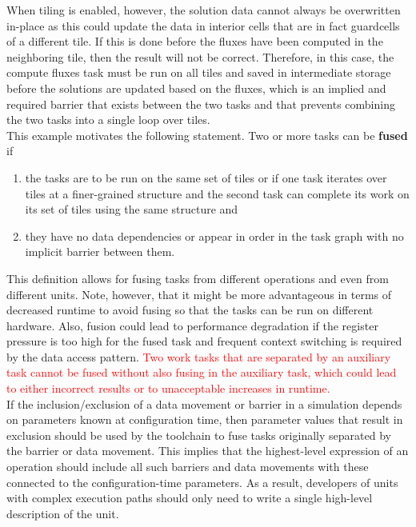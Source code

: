 \documentclass{article}
\begin{document}
When tiling is enabled, however, the solution data cannot always be overwritten
in-place as this could update the data in interior cells that are in fact
guardcells of a different tile.  If this is done before the fluxes have been
computed in the neighboring tile, then the result will not be correct.
Therefore, in this case, the compute fluxes task must be run on all tiles and
saved in intermediate storage before the solutions are updated based on the
fluxes, which is an implied and required barrier that exists between
the two tasks and that prevents combining the two tasks into a single loop over
tiles.\\


This example motivates the following statement.  Two or more tasks can be
\textbf{fused} if
\begin{enumerate}
\item{the tasks are to be run on the same set of tiles or if one task 
iterates over tiles at a finer-grained structure and the second task can
complete its work on its set of tiles using the same structure and}
\item{they have no data dependencies or appear in order in the task graph with
no implicit barrier between them.}
\end{enumerate}
This definition allows for fusing tasks from different operations and even from
different units.
Note, however, that it might be more advantageous in terms of decreased runtime
to avoid fusing so that the tasks can be run on different hardware.  Also,
fusion could lead to performance degradation if the register pressure is too
high for the fused task and frequent context switching is required by the data
access pattern.  \textcolor{red}{Two work tasks that are separated by
an auxiliary task cannot be fused without also fusing in the auxiliary task,
which could lead to either incorrect results or to unacceptable increases in
runtime.}\\

If the inclusion/exclusion of a data movement or barrier in a simulation depends
on parameters known at configuration time, then parameter values that result in
exclusion should be used by the toolchain to fuse tasks originally separated by
the barrier or data movement.  This implies that the highest-level expression of
an operation should include all such barriers and data movements with these
connected to the configuration-time parameters.  As a result, developers of
units with complex execution paths should only need to write a single high-level
description of the unit.\\
\end{document}

